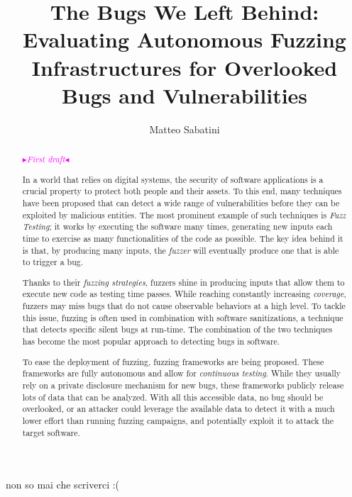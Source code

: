 \documentclass[binding=0.6cm, oneside]{sapthesis}%
\title{The Bugs We Left Behind: Evaluating Autonomous Fuzzing Infrastructures for Overlooked Bugs and Vulnerabilities}
\author{Matteo Sabatini}
\newcommand{\mytext}[2]{\textcolor{#1}{#2}}
\newcommand{\mynote}[2]{\xspace\fbox{\bfseries\sffamily\scriptsize{#1}}
	{\small$\blacktriangleright$\textsf{\scriptsize\emph{#2}}$\blacktriangleleft$}}
\newcommand{\matteo}[1]{\mytext{magenta}{\mynote{MM}{#1}}}
\begin{document}
\frontmatter
\maketitle

\begin{acknowledgments}
non so mai che scriverci :(
\end{acknowledgments}


\begin{abstract}

	\matteo{First draft}

	In a world that relies on digital systems, the security of software applications is a crucial property to protect both people and their assets. To this end, many techniques have been proposed that can detect a wide range of vulnerabilities before they can be exploited by malicious entities. The most prominent example of such techniques is \textit{Fuzz Testing}; it works by executing the software many times, generating new inputs each time to exercise as many functionalities of the code as possible. The key idea behind it is that, by producing many inputs, the \textit{fuzzer} will eventually produce one that is able to trigger a bug.

	Thanks to their \textit{fuzzing strategies}, fuzzers shine in producing inputs that allow them to execute new code as testing time passes. While reaching constantly increasing \textit{coverage}, fuzzers may miss bugs that do not cause observable behaviors at a high level. To tackle this issue, fuzzing is often used in combination with software sanitizations, a technique that detects specific silent bugs at run-time. The combination of the two techniques has become the most popular approach to detecting bugs in software.
   
	To ease the deployment of fuzzing, fuzzing frameworks are being proposed. These frameworks are fully autonomous and allow for \textit{continuous testing}. While they usually rely on a private disclosure mechanism for new bugs, these frameworks publicly release lots of data that can be analyzed. With all this accessible data, no bug should be overlooked, or an attacker could leverage the available data to detect it with a much lower effort than running fuzzing campaigns, and potentially exploit it to attack the target software.
	   

\end{abstract}
\end{document}
